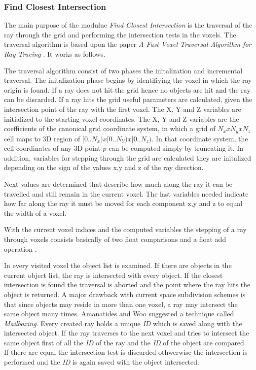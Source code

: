 \documentclass[DIV10, abstracton, openright, footsepline, headsepline, twoside, 9pt,
bigheadings]{scrreprt}
\begin{document}
\subsubsection{Find Closest Intersection}
\label{sec:design_find_closest_intersection}
The main purpose of the modulue \textit{Find Closest Intersection} is the traversal
of the ray through the grid and performing the intersection tests in the voxels.
The traversal algorithm is based upon the paper \textit{A Fast Voxel Traversal
Algorithm for Ray Tracing} \cite{Woo87}. It works as follows.

The traversal algorithm consist of two phases the initalization and incremental
traversal. The initalization phase begins by identifiying the voxel in which the
ray origin is found. If a ray does not hit the grid hence no objects are hit and
the ray can be discarded. If a ray hits the grid useful parameters are calculated,
given the intersection point of the ray with the first voxel. The X, Y and Z variables
are initialized to the starting voxel coordinates. The X, Y and Z variables are the
coefficients of the canonical grid coordinate system, in which a grid of
$N_x x N_y x N_z$ cell maps to 3D region of $[0..N_x) x [0..N_Y) x [0..N_z)$. In that
coordinate system, the cell coordinates of any 3D point $p$ can be computed simply
by truncating it. In addition, variables for stepping through the grid are calculated
they are initalized depending on the sign of the values x,y and z of the ray direction.

Next values are determined that describe how much along the ray it can be travelled
and still remain in the current voxel. The last variables needed indicate how far
along the ray it must be moved for each component x,y and z to equal the width of
a voxel.

With the current voxel indices and the computed variables the stepping of a ray through
voxels consists basically of two float comparisons and a float add operation
\cite{Woo87}.

In every visited voxel the object list is examined. If there are objects in the
current object list, the ray is intersected with every object. If the closest
intersection is found the traversal is aborted and the point where the ray hits
the object is returned. A major drawback with current space subdivision schemes
is that since objects may reside in more than one voxel, a ray may intersect the
same object many times. Amanatides and Woo suggested a technique called
\textit{Mailboxing}. Every created ray holds a unique \textit{ID} which is saved
along with the intersected object. If the ray traverses to the next voxel
and tries to intersect the same object first of all the \textit{ID} of the ray
and the \textit{ID} of the object are compared. If there are equal the intersection
test is discarded othwerwise the intersection is performed and the \textit{ID}
is again saved with the object intersected.
\end{document}
